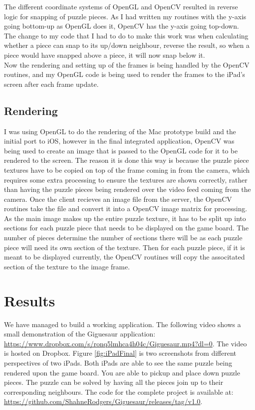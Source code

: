 \documentclass{article}
\begin{document}
The different coordinate systems of OpenGL and OpenCV resulted in reverse logic
for snapping of puzzle pieces. As I had written my routines with the y-axis
going bottom-up as OpenGL does it, OpenCV has the y-axis going top-down. The
change to my code that I had to do to make this work was when calculating
whether a piece can snap to its up/down neighbour, reverse the result, so when a
piece would have snapped above a piece, it will now snap below it.\\

Now the rendering and setting up of the frames is being handled by the OpenCV
routines, and my OpenGL code is being used to render the frames to the iPad's
screen after each frame update. 

\subsection{Rendering}
I was using OpenGL to do the rendering of the Mac prototype build and the
initial port to iOS, however in the final integrated application, OpenCV was
being used to create an image that is passed to the OpenGL code for it to be
rendered to the screen. The reason it is done this way is because the puzzle
piece textures have to be copied on top of the frame coming in from the
camera, which requires some extra processing to ensure the textures are shown
correctly, rather than having the puzzle pieces being rendered over the video
feed coming from the camera. Once the client recieves an image file from the
server, the OpenCV routines take the file and convert it into a OpenCV image
matrix for processing. As the main image makes up the entire puzzle texture, it
has to be split up into sections for each puzzle piece that needs to be
displayed on the game board. The number of pieces determine the number of
sections there will be as each puzzle piece will need its own section of the
texture. Then for each puzzle piece, if it is meant to be displayed currently,
the OpenCV routines will copy the associtated section of the texture to the
image frame.


\section{Results}
We have managed to build a working application. The following video shows a
small demonstration of the Giguesaur application:
\url{https://www.dropbox.com/s/ronq5lmhca4h04c/Giguesaur.mp4?dl=0}. The video is
hosted on Dropbox. Figure \ref{fig:iPadFinal} is two screenshots from different
perspectives of two iPads. Both iPads are able to see the same puzzle being
rendered upon the game board. You are able to pickup and place down puzzle
pieces. The puzzle can be solved by having all the pieces join up to their
corresponding neighbours. The code for the complete project is available at:
\url{https://github.com/ShahneRodgers/Giguesaur/releases/tag/v1.0}.
\end{document}
